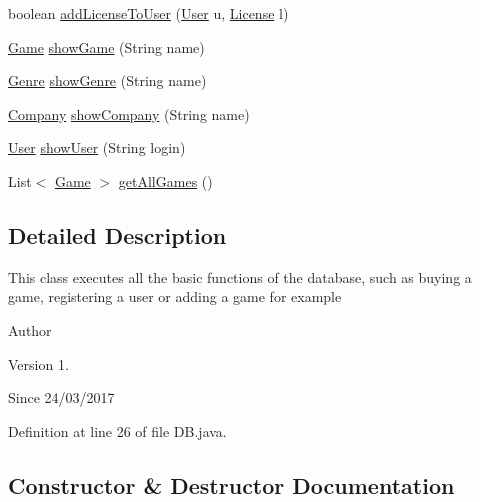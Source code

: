 \begin{DoxyCompactItemize}
\item 
boolean \hyperlink{classes_1_1deusto_1_1server_1_1db_1_1_d_b_a996d40d6b184ea0dfa3dcab05bc04757}{add\+License\+To\+User} (\hyperlink{classes_1_1deusto_1_1server_1_1db_1_1data_1_1_user}{User} u, \hyperlink{classes_1_1deusto_1_1server_1_1db_1_1data_1_1_license}{License} l)
\item 
\hyperlink{classes_1_1deusto_1_1server_1_1db_1_1data_1_1_game}{Game} \hyperlink{classes_1_1deusto_1_1server_1_1db_1_1_d_b_adba76c20f2fc7ed01d486564d881a718}{show\+Game} (String name)
\item 
\hyperlink{classes_1_1deusto_1_1server_1_1db_1_1data_1_1_genre}{Genre} \hyperlink{classes_1_1deusto_1_1server_1_1db_1_1_d_b_a207ddeb183db925dc20f095033aa4d94}{show\+Genre} (String name)
\item 
\hyperlink{classes_1_1deusto_1_1server_1_1db_1_1data_1_1_company}{Company} \hyperlink{classes_1_1deusto_1_1server_1_1db_1_1_d_b_ab5edf3ae158bb0501a882b1d724cc2a8}{show\+Company} (String name)
\item 
\hyperlink{classes_1_1deusto_1_1server_1_1db_1_1data_1_1_user}{User} \hyperlink{classes_1_1deusto_1_1server_1_1db_1_1_d_b_ac85523faea523033439a932bbcab2c7e}{show\+User} (String login)
\item 
List$<$ \hyperlink{classes_1_1deusto_1_1server_1_1db_1_1data_1_1_game}{Game} $>$ \hyperlink{classes_1_1deusto_1_1server_1_1db_1_1_d_b_ad878c1c58062596b5e1b582ed496bd11}{get\+All\+Games} ()
\end{DoxyCompactItemize}


\subsection{Detailed Description}
This class executes all the basic functions of the database, such as buying a game, registering a user or adding a game for example \begin{DoxyAuthor}{Author}

\end{DoxyAuthor}
\begin{DoxyVersion}{Version}
1. 
\end{DoxyVersion}
\begin{DoxySince}{Since}
24/03/2017 
\end{DoxySince}


Definition at line 26 of file D\+B.\+java.



\subsection{Constructor \& Destructor Documentation}
\mbox{\label{classes_1_1deusto_1_1server_1_1db_1_1_d_b_ab53f32f36928ba9aa3ddff65fce395dc}} 
